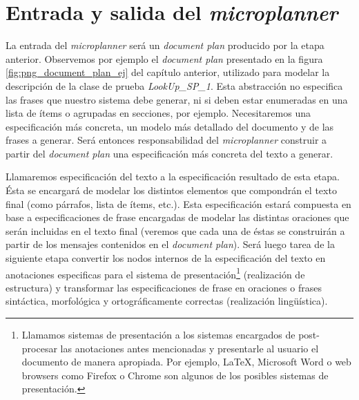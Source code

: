 

\section{Entrada y salida del \textit{microplanner}}
La entrada del \textit{microplanner} será un \textit{document plan} producido por la etapa anterior. Observemos por ejemplo el \textit{document plan} presentado en la figura \ref{fig:png_document_plan_ej} del capítulo anterior, utilizado para modelar la descripción de la clase de prueba \emph{LookUp\_SP\_1}. Esta abstracción no especifica las frases que nuestro sistema debe generar, ni si deben estar enumeradas en una lista de ítems o agrupadas en secciones, por ejemplo. Necesitaremos una especificación más concreta, un modelo más detallado del documento y de las frases a generar. Será entonces responsabilidad del \textit{microplanner}  construir a partir del \textit{document plan} una especificación más concreta del texto a generar.

Llamaremos especificación del texto a la especificación resultado de esta etapa. Ésta se encargará de modelar los distintos elementos que compondrán el texto final (como párrafos, lista de ítems, etc.). Esta especificación estará compuesta en base a especificaciones de frase encargadas de modelar las distintas oraciones que serán incluidas en el texto final (veremos que cada una de éstas se construirán a partir de los mensajes contenidos en el \textit{document plan}). Será luego tarea de la siguiente etapa convertir los nodos internos de la especificación del texto en anotaciones especificas para el sistema de presentación\footnote{Llamamos sistemas de presentación a los sistemas encargados de post-procesar las anotaciones antes mencionadas y presentarle al usuario el documento de manera apropiada. Por ejemplo, \LaTeX, Microsoft Word o web browsers como Firefox o Chrome son algunos de los posibles sistemas de presentación.} (realización de estructura) y transformar las especificaciones de frase en oraciones o frases sintáctica, morfológica y ortográficamente correctas (realización lingüística). 


